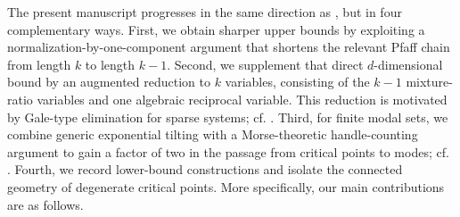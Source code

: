 \documentclass[11pt]{article}
\theoremstyle{plain}
\theoremstyle{definition}
\theoremstyle{remark}
\numberwithin{equation}{section}
\begin{document}
The present manuscript progresses in the same direction as \citet{AmendolaEngstromHaase2019}, but in four complementary ways. First, we obtain sharper upper bounds by exploiting a normalization-by-one-component argument that shortens the relevant Pfaff chain from length $k$ to length $k-1$. Second, we supplement that direct $d$-dimensional bound by an augmented reduction to $k$ variables, consisting of the $k-1$ mixture-ratio variables and one algebraic reciprocal variable. This reduction is motivated by Gale-type elimination for sparse systems; cf. \citet[Chapter~6]{Sottile2011}. Third, for finite modal sets, we combine generic exponential tilting with a Morse-theoretic handle-counting argument to gain a factor of two in the passage from critical points to modes; cf. \citet[Chapters~1--3]{Knudson2015}. Fourth, we record lower-bound constructions and isolate the connected geometry of degenerate critical points. More specifically, our main contributions are as follows.
\end{document}
